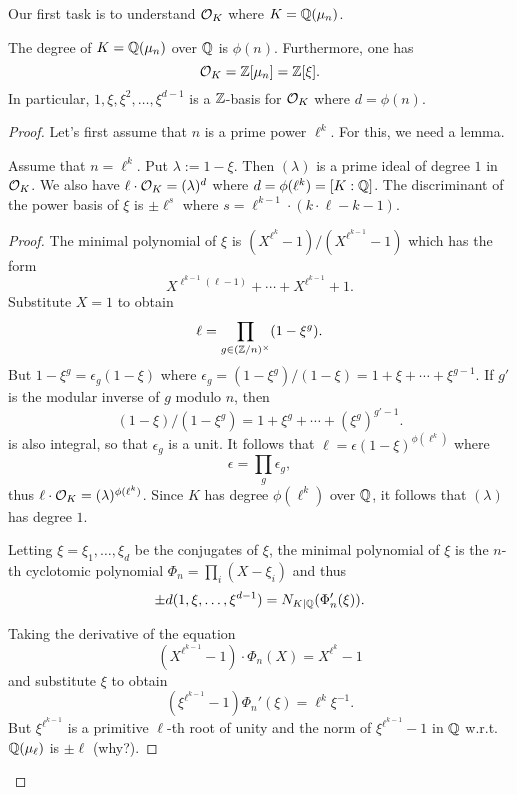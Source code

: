 Our first task is to understand $\mathcal{O}_{K}$ where $K = \mathbb{Q}(\mu_{n})$.
\begin{theorem}
  The degree of $K = \mathbb{Q}(\mu_{n})$ over $\mathbb{Q}$ is $\phi(n)$.
  Furthermore, one has
  \[ \mathcal{O}_{K} = \mathbb{Z}[\mu_{n}] = \mathbb{Z}[\xi]. \]
  In particular, $1,\xi,\xi^{2},\ldots,\xi^{d-1}$ is a $\mathbb{Z}$-basis for $\mathcal{O}_{K}$ where $d = \phi(n)$.
\end{theorem}
\begin{proof}
  Let's first assume that $n$ is a prime power $\ell^{k}$.
  For this, we need a lemma.
  \begin{lemma}
    Assume that $n = \ell^{k}$.
    Put $\lambda := 1 - \xi$.
    Then $(\lambda)$ is a prime ideal of degree $1$ in $\mathcal{O}_{K}$.
    We also have $\ell \cdot \mathcal{O}_{K} = (\lambda)^{d}$ where $d = \phi(\ell^{k}) = [K:\mathbb{Q}]$.
    The discriminant of the power basis of $\xi$ is $\pm \ell^{s}$ where $s = \ell^{k-1} \cdot (k \cdot \ell - k - 1)$.
  \end{lemma}
  \begin{proof}
    The minimal polynomial of $\xi$ is $(X^{\ell^{k}} - 1)/(X^{\ell^{k-1}}-1)$ which has the form
    \[ X^{\ell^{k-1}(\ell-1)} + \cdots + X^{\ell^{k-1}} + 1. \]
    Substitute $X = 1$ to obtain
    \[ \ell = \prod_{g \in (\mathbb{Z}/n)^{\times}} (1 - \xi^{g}). \]
    But $1 - \xi^{g} = \epsilon_{g} (1 - \xi)$ where $\epsilon_{g} = (1 - \xi^{g})/(1 - \xi) = 1 + \xi + \cdots + \xi^{g-1}$.
    If $g'$ is the modular inverse of $g$ modulo $n$, then
    \[ (1 - \xi)/(1-\xi^{g}) = 1 + \xi^{g} + \cdots + (\xi^{g})^{g'-1}. \]
    is also integral, so that $\epsilon_{g}$ is a unit.
    It follows that $\ell = \epsilon(1-\xi)^{\phi(\ell^{k})}$ where
    \[ \epsilon = \prod_{g} \epsilon_{g}, \]
    thus $\ell \cdot \mathcal{O}_{K} = (\lambda)^{\phi(\ell^{k})}$.
    Since $K$ has degree $\phi(\ell^{k})$ over $\mathbb{Q}$, it follows that $(\lambda)$ has degree $1$.

    Letting $\xi = \xi_{1},\ldots,\xi_{d}$ be the conjugates of $\xi$, the minimal polynomial of $\xi$ is the $n$-th cyclotomic polynomial $\Phi_{n} = \prod_{i}(X-\xi_{i})$ and thus
    \[ \pm d(1,\xi,\ldots,\xi^{d-1}) = N_{K|\mathbb{Q}}(\Phi_{n}'(\xi)). \]

    Taking the derivative of the equation
    \[ (X^{\ell^{k-1}}-1) \cdot \Phi_{n}(X) = X^{\ell^{k}}-1 \]
    and substitute $\xi$ to obtain
    \[ (\xi^{\ell^{k-1}}-1) \Phi_{n}'(\xi) = \ell^{k} \xi^{-1}. \]
    But $\xi^{\ell^{k-1}}$ is a primitive $\ell$-th root of unity and the norm of $\xi^{\ell^{k-1}}-1$ in $\mathbb{Q}$ w.r.t.~$\mathbb{Q}(\mu_{\ell})$ is $\pm \ell$ (why?).


\end{proof}
\end{proof}
